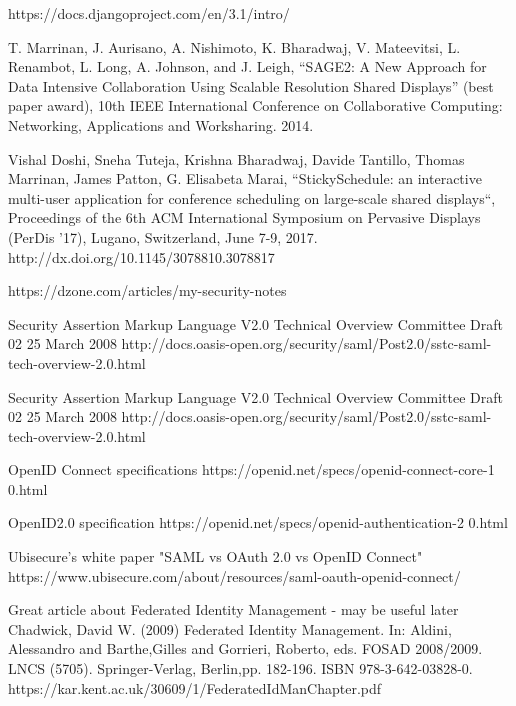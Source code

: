 \documentclass[magisterska,en]{pracamgr}
\begin{document}
\begin{thebibliography}{9}

  https://docs.djangoproject.com/en/3.1/intro/
  
  T. Marrinan, J. Aurisano, A. Nishimoto, K. Bharadwaj, V. Mateevitsi, L. Renambot, L. Long, A. Johnson, and J. Leigh, “SAGE2: A New Approach for Data Intensive Collaboration Using Scalable Resolution Shared Displays” (best paper award), 10th IEEE International Conference on Collaborative Computing: Networking, Applications and Worksharing. 2014.
  
  Vishal Doshi, Sneha Tuteja, Krishna Bharadwaj, Davide Tantillo, Thomas Marrinan, James Patton, G. Elisabeta Marai, “StickySchedule: an interactive multi-user application for conference scheduling on large-scale shared displays“, Proceedings of the 6th ACM International Symposium on Pervasive Displays (PerDis ’17), Lugano, Switzerland, June 7-9, 2017. http://dx.doi.org/10.1145/3078810.3078817
  
  
  https://dzone.com/articles/my-security-notes
  
Security Assertion Markup Language V2.0 Technical Overview
Committee Draft 02
25 March 2008
http://docs.oasis-open.org/security/saml/Post2.0/sstc-saml-tech-overview-2.0.html
 
Security Assertion Markup Language V2.0 Technical Overview
Committee Draft 02
25 March 2008
http://docs.oasis-open.org/security/saml/Post2.0/sstc-saml-tech-overview-2.0.html
 
 
OpenID Connect specifications
https://openid.net/specs/openid-connect-core-1 0.html
 
OpenID2.0 specification
https://openid.net/specs/openid-authentication-2 0.html
 
Ubisecure's white paper "SAML vs OAuth 2.0 vs OpenID Connect"
https://www.ubisecure.com/about/resources/saml-oauth-openid-connect/

Great article about Federated Identity Management - may be useful later
Chadwick, David W.  (2009) Federated Identity Management.    In: Aldini, Alessandro and Barthe,Gilles and Gorrieri, Roberto, eds. FOSAD 2008/2009.   LNCS  (5705).  Springer-Verlag, Berlin,pp. 182-196. ISBN 978-3-642-03828-0.
https://kar.kent.ac.uk/30609/1/FederatedIdManChapter.pdf
 

\end{thebibliography}
\end{document}
